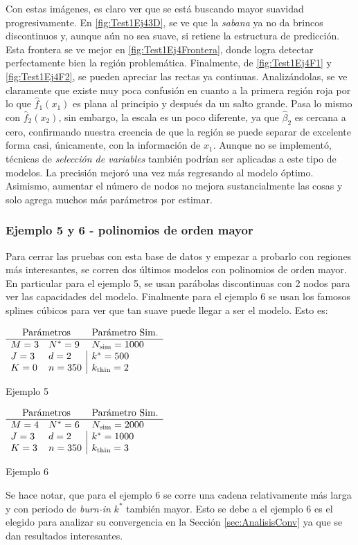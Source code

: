 \documentclass[../Main/Main.tex]{subfiles}
\begin{document}
Con estas imágenes, es claro ver que se está buscando mayor suavidad progresivamente. En \ref{fig:Test1Ej43D}, se ve que la \textit{sabana} ya no da brincos discontinuos y, aunque aún no sea suave, si retiene la estructura de predicción. Esta frontera se ve mejor en \ref{fig:Test1Ej4Frontera}, donde logra detectar perfectamente bien la región problemática. Finalmente, de \ref{fig:Test1Ej4F1} y \ref{fig:Test1Ej4F2}, se pueden apreciar las rectas ya continuas. Analizándolas, se ve claramente que existe muy poca confusión en cuanto a la primera región roja por lo que $\hat{f}_1(x_1)$ es plana al principio y después da un salto grande. Pasa lo mismo con $\hat{f}_2(x_2)$, sin embargo, la escala es un poco diferente, ya que $\hat{\beta}_2$ es cercana a cero, confirmando nuestra creencia de que la región se puede separar de excelente forma casi, únicamente, con la información de $x_1$. Aunque no se implementó, técnicas de \textit{selección de variables} también podrían ser aplicadas a este tipo de modelos. La precisión mejoró una vez más regresando al modelo óptimo. Asimismo, aumentar el número de nodos no mejora sustancialmente las cosas y solo agrega muchos más parámetros por estimar. 

\subsubsection*{Ejemplo 5 y 6 - polinomios de orden mayor} \label{sec:Test1Ej6}
Para cerrar las pruebas con esta base de datos y empezar a probarlo con regiones más interesantes, se corren dos últimos modelos con polinomios de orden mayor. En particular para el ejemplo 5, se usan parábolas discontinuas con 2 nodos para ver las capacidades del modelo. Finalmente para el ejemplo 6 se usan los famosos splines cúbicos para ver que tan suave puede llegar a ser el modelo. Esto es:
\begin{table}[H]
	\begin{subtable}{0.45\textwidth}
	\centering
	$\paramsmod{3}{3}{0}{9}{2}{350}{1000}{500}{2}$
	\caption*{Ejemplo 5}
	\end{subtable}
	\quad
	\begin{subtable}{0.45\textwidth}
	\centering
	$\paramsmod{4}{3}{3}{6}{2}{350}{2000}{1000}{3}$	
	\caption*{Ejemplo 6}
	\label{ej:6}
	\end{subtable}
\end{table}
Se hace notar, que para el ejemplo 6 se corre una cadena relativamente más larga y con periodo de \textit{burn-in} $k^*$ también mayor. Esto se debe a el ejemplo 6 es el elegido para analizar su convergencia en la Sección \ref{sec:AnalisisConv} ya que se dan resultados interesantes.
\end{document}
